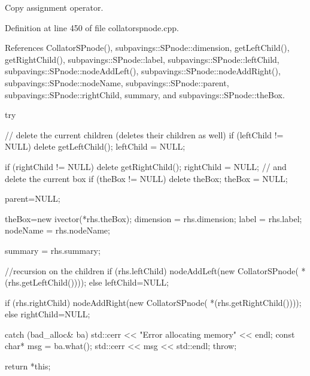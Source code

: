 \-Copy assignment operator. 



\-Definition at line 450 of file collatorspnode.\-cpp.



\-References \-Collator\-S\-Pnode(), subpavings\-::\-S\-Pnode\-::dimension, get\-Left\-Child(), get\-Right\-Child(), subpavings\-::\-S\-Pnode\-::label, subpavings\-::\-S\-Pnode\-::left\-Child, subpavings\-::\-S\-Pnode\-::node\-Add\-Left(), subpavings\-::\-S\-Pnode\-::node\-Add\-Right(), subpavings\-::\-S\-Pnode\-::node\-Name, subpavings\-::\-S\-Pnode\-::parent, subpavings\-::\-S\-Pnode\-::right\-Child, summary, and subpavings\-::\-S\-Pnode\-::the\-Box.


\begin{DoxyCode}
    {
        try {

            // delete the current children (deletes their children as well)
            if (leftChild != NULL) {
                delete getLeftChild();
                leftChild = NULL;
            }

            if (rightChild != NULL) {
                delete getRightChild();
                rightChild = NULL;
            }
            // and delete the current box
            if (theBox != NULL) {
                delete theBox;
                theBox = NULL;
            }

            parent=NULL;

            theBox=new ivector(*rhs.theBox);
            dimension = rhs.dimension;
            label = rhs.label;
            nodeName = rhs.nodeName;

            summary = rhs.summary;

            //recursion on the children
            if (rhs.leftChild) {
                nodeAddLeft(new CollatorSPnode(
                    *(rhs.getLeftChild())));
            }
            else leftChild=NULL;

            if (rhs.rightChild) {
                nodeAddRight(new CollatorSPnode(
                    *(rhs.getRightChild())));
            }
            else rightChild=NULL;
        }
        catch (bad_alloc& ba) {
            std::cerr << "Error allocating memory" << endl;
            const char* msg = ba.what();
            std::cerr << msg << std::endl;
            throw;
        }

        return *this;

    }
\end{DoxyCode}
